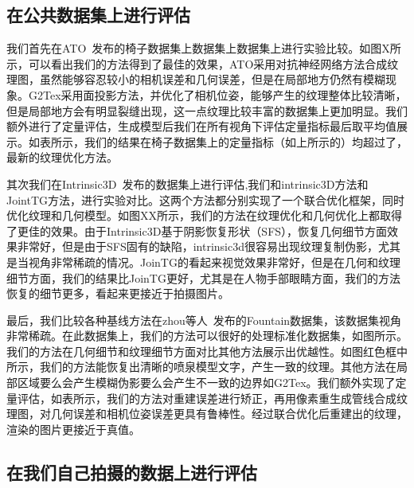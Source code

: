\subsection{在公共数据集上进行评估}
我们首先在ATO~\cite{JingweiHuang2020AdversarialTO}发布的椅子数据集上数据集上数据集上进行实验比较。如图X所示，可以看出我们的方法得到了最佳的效果，ATO采用对抗神经网络方法合成纹理图，虽然能够容忍较小的相机误差和几何误差，但是在局部地方仍然有模糊现象。G2Tex采用面投影方法，并优化了相机位姿，能够产生的纹理整体比较清晰，但是局部地方会有明显裂缝出现，这一点纹理比较丰富的数据集上更加明显。我们额外进行了定量评估，生成模型后我们在所有视角下评估定量指标最后取平均值展示。如表所示，我们的结果在椅子数据集上的定量指标（如上所示的）均超过了，最新的纹理优化方法。\par
其次我们在Intrinsic3D~\cite{RobertMaier2017Intrinsic3DH3}发布的数据集上进行评估,我们和intrinsic3D方法和JointTG方法，进行实验对比。这两个方法都分别实现了一个联合优化框架，同时优化纹理和几何模型。如图XX所示，我们的方法在纹理优化和几何优化上都取得了更佳的效果。由于Intrinsic3D基于阴影恢复形状（SFS），恢复几何细节方面效果非常好，但是由于SFS固有的缺陷，intrinsic3d很容易出现纹理复制伪影，尤其是当视角非常稀疏的情况。JoinTG的看起来视觉效果非常好，但是在几何和纹理细节方面，我们的结果比JoinTG更好，尤其是在人物手部眼睛方面，我们的方法恢复的细节更多，看起来更接近于拍摄图片。\par
最后，我们比较各种基线方法在zhou等人~\cite{Zhou2018}发布的Fountain数据集，该数据集视角非常稀疏。在此数据集上，我们的方法可以很好的处理标准化数据集，如图所示。我们的方法在几何细节和纹理细节方面对比其他方法展示出优越性。如图红色框中所示，我们的方法能恢复出清晰的喷泉模型文字，产生一致的纹理。其他方法在局部区域要么会产生模糊伪影要么会产生不一致的边界如G2Tex。我们额外实现了定量评估，如表所示，我们的方法对重建误差进行矫正，再用像素重生成管线合成纹理图，对几何误差和相机位姿误差更具有鲁棒性。经过联合优化后重建出的纹理，渲染的图片更接近于真值。\par
\subsection{在我们自己拍摄的数据上进行评估}
